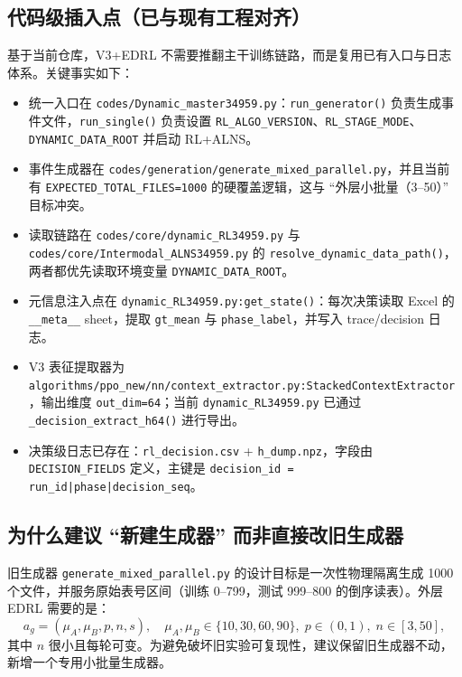 \documentclass[UTF8,11pt,a4paper]{ctexart}
\begin{document}
\subsection{代码级插入点（已与现有工程对齐）}
基于当前仓库，V3+EDRL 不需要推翻主干训练链路，而是复用已有入口与日志体系。关键事实如下：
\begin{itemize}
\item 统一入口在 \texttt{codes/Dynamic\_master34959.py}：\texttt{run\_generator()} 负责生成事件文件，\texttt{run\_single()} 负责设置 \texttt{RL\_ALGO\_VERSION}、\texttt{RL\_STAGE\_MODE}、\texttt{DYNAMIC\_DATA\_ROOT} 并启动 RL+ALNS。
\item 事件生成器在 \texttt{codes/generation/generate\_mixed\_parallel.py}，并且当前有 \texttt{EXPECTED\_TOTAL\_FILES=1000} 的硬覆盖逻辑，这与 ``外层小批量（3--50）'' 目标冲突。
\item 读取链路在 \texttt{codes/core/dynamic\_RL34959.py} 与 \texttt{codes/core/Intermodal\_ALNS34959.py} 的 \texttt{resolve\_dynamic\_data\_path()}，两者都优先读取环境变量 \texttt{DYNAMIC\_DATA\_ROOT}。
\item 元信息注入点在 \texttt{dynamic\_RL34959.py:get\_state()}：每次决策读取 Excel 的 \texttt{\_\_meta\_\_} sheet，提取 \texttt{gt\_mean} 与 \texttt{phase\_label}，并写入 trace/decision 日志。
\item V3 表征提取器为 \texttt{algorithms/ppo\_new/nn/context\_extractor.py:StackedContextExtractor}，输出维度 \texttt{out\_dim=64}；当前 \texttt{dynamic\_RL34959.py} 已通过 \texttt{\_decision\_extract\_h64()} 进行导出。
\item 决策级日志已存在：\texttt{rl\_decision.csv} + \texttt{h\_dump.npz}，字段由 \texttt{DECISION\_FIELDS} 定义，主键是 \texttt{decision\_id = run\_id|phase|decision\_seq}。
\end{itemize}

\subsection{为什么建议 ``新建生成器'' 而非直接改旧生成器}
旧生成器 \texttt{generate\_mixed\_parallel.py} 的设计目标是一次性物理隔离生成 1000 个文件，并服务原始表号区间（训练 0--799，测试 999--800 的倒序读表）。外层 EDRL 需要的是：
\begin{equation}
a_g=(\mu_A,\mu_B,p,n,s),\quad \mu_A,\mu_B\in\{10,30,60,90\},\;p\in(0,1),\;n\in[3,50],
\end{equation}
其中 $n$ 很小且每轮可变。为避免破坏旧实验可复现性，建议保留旧生成器不动，新增一个专用小批量生成器。
\end{document}
